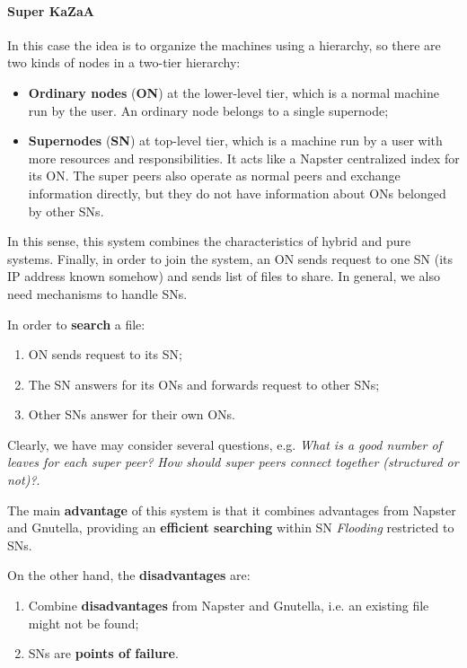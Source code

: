 \paragraph{Super KaZaA}
In this case the idea is to organize the machines using a hierarchy, so there are two kinds of nodes in a two-tier hierarchy:
\begin{itemize}
    \item \textbf{Ordinary nodes} (\textbf{ON}) at the lower-level tier, which is a normal machine run by the user. An ordinary node belongs to a single supernode;
    \item \textbf{Supernodes} (\textbf{SN}) at top-level tier, which is a machine run by a user with more resources and responsibilities. It acts like a Napster centralized index for its ON. The super peers also operate as normal peers and exchange information directly, but they do not have information about ONs belonged by other SNs.
\end{itemize}

In this sense, this system combines the characteristics of hybrid and pure systems. Finally, in order to join the system, an ON sends request to one SN (its IP address known somehow) and sends list of files to share. In general, we also need mechanisms to handle SNs.

In order to \textbf{search} a file:
\begin{enumerate}
    \item ON sends request to its SN;
    \item The SN answers for its ONs and forwards request to other SNs;
    \item Other SNs answer for their own ONs.
\end{enumerate}

Clearly, we have may consider several questions, e.g. \textit{What is a good number of leaves for each super peer?} \textit{How should super peers connect together (structured or not)?}.

The main \textbf{advantage} of this system is that it combines advantages from Napster and Gnutella, providing an \textbf{efficient searching} within SN \textit{Flooding} restricted to SNs.

On the other hand, the \textbf{disadvantages} are:
\begin{enumerate}
    \item Combine \textbf{disadvantages} from Napster and Gnutella, i.e. an existing file might not be found;
    \item SNs are \textbf{points of failure}.
\end{enumerate}

